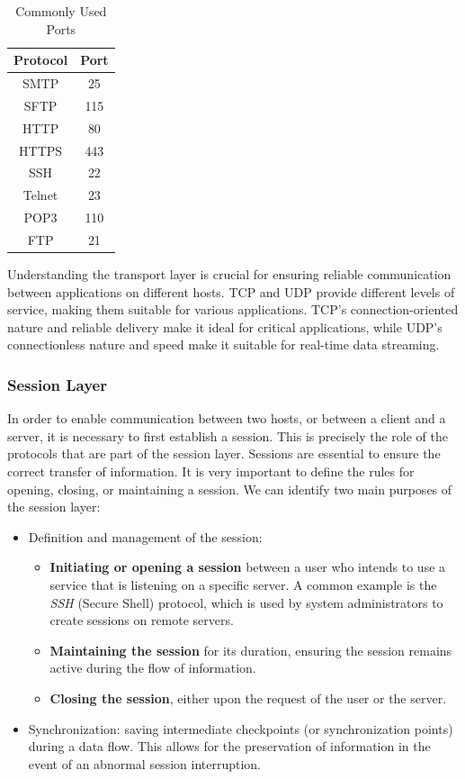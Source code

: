 \begin{table}[h]
    \centering
    \begin{tabular}{|c|c|}
        \hline
        \textbf{Protocol} & \textbf{Port} \\
        \hline
        SMTP & 25 \\
        SFTP & 115 \\
        HTTP & 80 \\
        HTTPS & 443 \\
        SSH & 22 \\
        Telnet & 23 \\
        POP3 & 110 \\
        FTP & 21 \\
        \hline
    \end{tabular}
    \caption{Commonly Used Ports}
    \label{tab:ports}
\end{table}

Understanding the transport layer is crucial for ensuring reliable communication between applications on different hosts. TCP and UDP provide different levels of service, making them suitable for various applications. TCP's connection-oriented nature and reliable delivery make it ideal for critical applications, while UDP's connectionless nature and speed make it suitable for real-time data streaming.


\subsubsection{\textbf{Session Layer}}
In order to enable communication between two hosts, or between a client and a server, it is necessary to first establish a session. This is precisely the role of the protocols that are part of the session layer. Sessions are essential to ensure the correct transfer of information. It is very important to define the rules for opening, closing, or maintaining a session. We can identify two main purposes of the session layer:

\begin{itemize}
    \item Definition and management of the session:
    \begin{itemize}
        \item \textbf{Initiating or opening a session} between a user who intends to use a service that is listening on a specific server. A common example is the \textit{SSH} (Secure Shell) protocol, which is used by system administrators to create sessions on remote servers.
        \item \textbf{Maintaining the session} for its duration, ensuring the session remains active during the flow of information.
        \item \textbf{Closing the session}, either upon the request of the user or the server.
    \end{itemize}
    \item Synchronization: saving intermediate checkpoints (or synchronization points) during a data flow. This allows for the preservation of information in the event of an abnormal session interruption.
\end{itemize}

